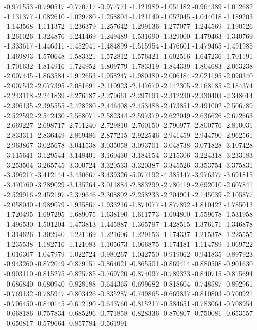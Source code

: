 -0.971553
-0.790517
-0.770717
-0.977771
-1.121989
-1.051182
-0.964389
-1.012682
-1.131377
-1.082610
-1.029780
-1.258804
-1.121140
-1.052045
-1.044018
-1.189203
-1.143568
-1.111372
-1.236379
-1.257642
-1.299136
-1.277077
-1.244569
-1.190526
-1.261026
-1.324876
-1.241469
-1.249489
-1.531690
-1.329000
-1.479463
-1.340769
-1.333617
-1.446311
-1.452941
-1.484899
-1.515954
-1.476601
-1.479465
-1.491985
-1.469893
-1.570648
-1.583321
-1.572812
-1.576421
-1.602516
-1.647236
-1.701191
-1.701632
-1.814916
-1.724952
-1.809779
-1.783319
-1.844339
-1.804683
-2.063238
-2.007445
-1.863584
-1.912653
-1.958247
-1.980480
-2.006184
-2.021195
-2.090340
-2.007542
-2.077395
-2.081691
-2.110923
-2.147679
-2.142305
-2.168185
-2.184374
-2.243118
-2.241839
-2.276187
-2.279661
-2.297191
-2.312230
-2.330403
-2.348014
-2.396135
-2.395555
-2.428280
-2.446408
-2.453488
-2.473851
-2.491002
-2.506789
-2.522592
-2.542430
-2.568071
-2.582344
-2.597379
-2.622049
-2.636626
-2.672663
-2.669227
-2.698717
-2.711240
-2.729810
-2.760150
-2.790977
-2.800776
-2.810031
-2.833311
-2.836449
-2.869486
-2.877215
-2.922546
-2.941459
-2.944790
-2.962561
-2.963867
-3.025678
-3.041538
-3.035058
-3.093701
-3.048738
-3.071828
-3.107428
-3.115641
-3.129544
-3.148401
-3.160430
-3.184154
-3.215306
-3.224318
-3.233183
-3.253504
-3.265745
-3.300724
-3.320533
-3.320387
-3.345526
-3.353754
-3.375831
-3.396217
-3.412144
-3.430667
-3.439326
-5.077192
-4.385147
-3.976377
-3.691815
-3.470760
-3.289029
-3.135264
-3.011884
-2.883299
-2.780419
-2.692010
-2.607841
-2.529916
-2.452197
-2.379646
-2.308802
-2.258233
-2.204901
-2.145039
-2.105877
-2.058040
-1.989079
-1.935867
-1.933216
-1.871077
-1.877892
-1.810422
-1.785013
-1.720495
-1.697295
-1.689075
-1.638190
-1.611773
-1.604800
-1.559678
-1.531958
-1.496530
-1.501204
-1.473813
-1.445887
-1.365797
-1.428515
-1.376171
-1.346878
-1.314626
-1.302940
-1.221169
-1.221606
-1.229153
-1.174337
-1.215378
-1.225555
-1.235538
-1.182716
-1.121083
-1.105673
-1.066875
-1.174181
-1.114789
-1.069722
-1.016307
-1.047979
-1.022724
-0.980267
-1.042750
-0.919062
-0.941835
-0.897923
-0.943260
-0.872049
-0.879151
-0.864021
-0.865501
-0.869414
-0.880508
-0.901630
-0.903110
-0.815275
-0.825785
-0.769720
-0.874097
-0.789323
-0.840715
-0.815694
-0.686840
-0.680940
-0.828188
-0.644365
-0.699682
-0.818604
-0.748587
-0.892961
-0.769132
-0.785947
-0.803426
-0.835287
-0.749865
-0.669837
-0.810803
-0.700921
-0.706450
-0.840145
-0.612190
-0.643760
-0.815217
-0.584651
-0.783064
-0.708954
-0.668186
-0.757834
-0.685296
-0.771858
-0.828336
-0.870807
-0.750081
-0.653557
-0.650817
-0.579664
-0.857784
-0.561991
